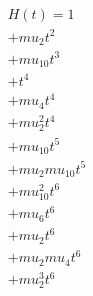\begin{align*}
H(t) = {}1 \\
  + mu_2 t^{2} \\
  + mu_10 t^{3} \\
  + t^{4} \\
  + mu_4 t^{4} \\
  + mu_2^{2} t^{4} \\
  + mu_10 t^{5} \\
  + mu_2 mu_10 t^{5} \\
  + mu_10^{2} t^{6} \\
  + mu_6 t^{6} \\
  + mu_2 t^{6} \\
  + mu_2 mu_4 t^{6} \\
  + mu_2^{3} t^{6}
\end{align*}
